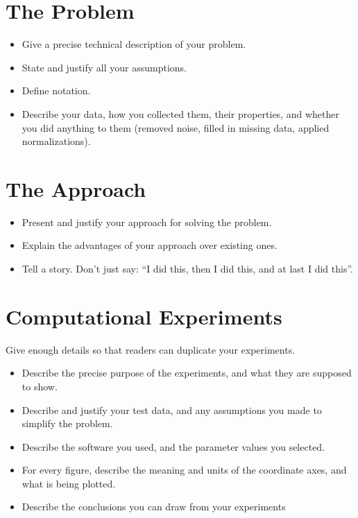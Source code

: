\documentclass[10pt]{article}
\begin{document}
\section{The Problem}
\begin{itemize}
\item Give a precise technical description of your problem. 

\item State and justify all your assumptions. 

\item Define notation. 

\item Describe your data, how you collected them, their properties,
and whether you did 
anything to them (removed noise, filled in missing data, 
applied normalizations).
\end{itemize}

\section{The Approach}
\begin{itemize}
\item Present and justify your approach for solving the problem. 
\item Explain the advantages of your approach over existing ones.

\item Tell a story.
Don't just say: ``I did this, then I did this, and at last I did this''.
\end{itemize}

\section{Computational Experiments}
Give enough details so that readers can duplicate your experiments.

\begin{itemize}
\item Describe the precise purpose of the experiments, and what they 
are supposed to show.

\item Describe and justify your test data, and any assumptions you made to 
simplify the problem.

\item Describe the software you used, and the 
parameter values you selected.

\item 
For every figure, describe the meaning and units of the coordinate axes, 
and what is being plotted.

\item Describe the conclusions you can draw from your experiments
\end{itemize}
\end{document}
